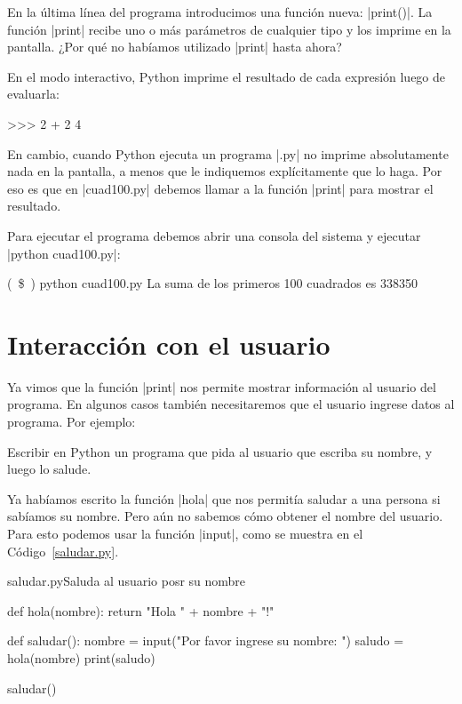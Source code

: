 En la última línea del programa introducimos una función nueva: |print()|.
La función |print| recibe uno o más parámetros de cualquier tipo y los imprime
en la pantalla. ¿Por qué no habíamos utilizado |print| hasta ahora?

En el modo interactivo, Python imprime el resultado de cada expresión luego de
evaluarla:

\begin{codigo-python-sn}
>>> 2 + 2
4
\end{codigo-python-sn}

En cambio, cuando Python ejecuta un programa |.py| no imprime absolutamente
nada en la pantalla, a menos que le indiquemos explícitamente que lo haga. Por
eso es que en |cuad100.py| debemos llamar a la función |print| para mostrar el
resultado.

Para ejecutar el programa debemos abrir una consola del sistema y ejecutar
|python cuad100.py|:

\begin{codigo-nohl-sn}
(~\$~) python cuad100.py
La suma de los primeros 100 cuadrados es 338350
\end{codigo-nohl-sn}

\section{Interacción con el usuario}

Ya vimos que la función |print| nos permite mostrar información al usuario del
programa. En algunos casos también necesitaremos que el usuario ingrese datos
al programa. Por ejemplo:

\begin{problema}
Escribir en Python un programa que pida al usuario que escriba su nombre, y
luego lo salude.

\begin{solucion}
Ya habíamos escrito la función |hola| que nos permitía saludar a una
persona si sabíamos su nombre. Pero aún no sabemos cómo obtener el nombre del
usuario. Para esto podemos usar la función |input|, como se muestra en el
Código~\ref{saludar.py}.

\begin{codigo}{saludar.py}{Saluda al usuario posr su nombre}
\label{saludar.py}
\begin{codigo-python}
def hola(nombre):
    return "Hola " + nombre + "!"

def saludar():
    nombre = input("Por favor ingrese su nombre: ")
    saludo = hola(nombre)
    print(saludo)

saludar()
\end{codigo-python}
\end{codigo}
\end{solucion}
\end{problema}

